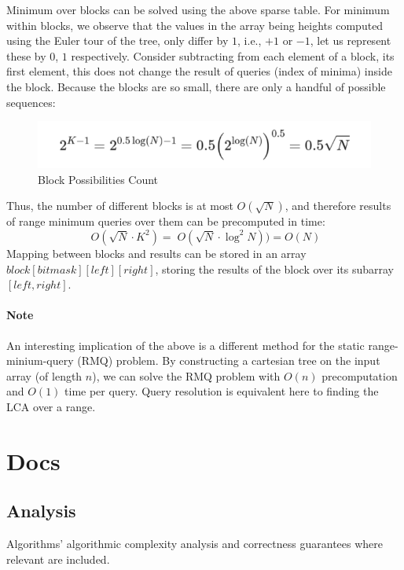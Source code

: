 \documentclass[12pt]{article}
\begin{document}
Minimum over blocks can be solved using the above sparse table.  
For minimum within blocks, we observe that the values in the array being heights computed using the Euler tour of the tree, only differ by $1$, i.e., $+1$ or $-1$, let us represent these by $0$, $1$ respectively.  
Consider subtracting from each element of a block, its first element, this does not change the result of queries (index of minima) inside the block.  
Because the blocks are so small, there are only a handful of possible sequences:  

\begin{figure}[H]
  \centering
  \includegraphics[width=0.7\linewidth]{block-calculations.png}
  \caption{Block Possibilities Count\cite{lca_farachcoltonbender}}
\end{figure}

Thus, the number of different blocks is at most $O(\sqrt N)$, and therefore results of range minimum queries over them can be precomputed in time: $$\;O(\sqrt N \cdot K^2) = \;O(\sqrt N\cdot \log^2 N)) = O(N)$$
Mapping between blocks and results can be stored in an array $block[bitmask][left][right]$, storing the results of the block over its subarray $[left,right]$.

\paragraph{Note}
An interesting implication of the above is a different method for the static range-minium-query (RMQ) problem.\cite{lca_rmq}  
By constructing a cartesian tree on the input array (of length $n$), we can solve the RMQ problem with $O(n)$ precomputation and $O(1)$ time per query.  
Query resolution is equivalent here to finding the LCA over a range.

\section{Docs}\label{sec:docs}

\subsection{Analysis}
Algorithms' algorithmic complexity analysis and correctness guarantees where relevant are included.  
\end{document}
